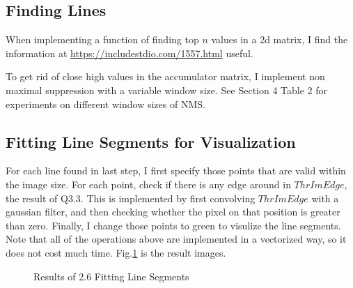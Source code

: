 \documentclass[
  course = {{16-720B Computer Vision}},
  quartile = {{1}},
  assignment = 1-Hough\ Transform,
  name = {{Kangle Deng}},
  email = {{kangled@andrew.cmu.edu}},
  firstexercise = 1
]{aga-homework}
\begin{document}
\subsection{Finding Lines}
When implementing a function of finding top $n$ values in a 2d matrix, I find the information at \url{https://includestdio.com/1557.html} useful.

To get rid of close high values in the accumulator matrix, I implement non maximal suppression with a variable window size. See Section 4 Table 2 for experiments on different window sizes of NMS.

\subsection{Fitting Line Segments for Visualization}
For each line found in last step, I first specify those points that are valid within the image size. For each point, check if there is any edge around in $ThrImEdge$, the result of Q3.3. This is implemented by first convolving $ThrImEdge$ with a gaussian filter, and then checking whether the pixel on that position is greater than zero. Finally, I change those points to green to visulize the line segments. Note that all of the operations above are implemented in a vectorized way, so it does not cost much time. Fig.\ref{fig:final} is the result images.

\begin{figure}
    \centering

    \caption{Results of 2.6 Fitting Line Segments}
    \label{fig:final}
\end{figure}
\end{document}
